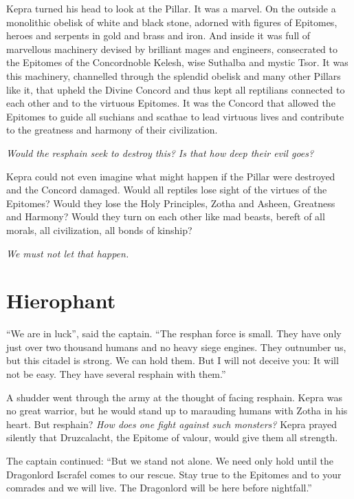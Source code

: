 \documentclass
  [a4paper,
   12pt,
   oneside
  ]%
  {article}
\begin{document}
Kepra turned his head to look at the Pillar. It was a marvel. On the outside a monolithic obelisk of white and black stone, adorned with figures of Epitomes, heroes and serpents in gold and brass and iron. And inside it was full of marvellous machinery devised by brilliant mages and engineers, consecrated to the Epitomes of the Concord\dash{}noble Kelesh, wise Suthalba and mystic Tsor. It was this machinery, channelled through the splendid obelisk and many other Pillars like it, that upheld the Divine Concord and thus kept all reptilians connected to each other and to the virtuous Epitomes. It was the Concord that allowed the Epitomes to guide all suchians and scathae to lead virtuous lives and contribute to the greatness and harmony of their civilization.

\emph{Would the resphain seek to destroy this? Is that how deep their evil goes?}

Kepra could not even imagine what might happen if the Pillar were destroyed and the Concord damaged. Would all reptiles lose sight of the virtues of the Epitomes? Would they lose the Holy Principles, Zotha and Asheen, Greatness and Harmony? Would they turn on each other like mad beasts, bereft of all morals, all civilization, all bonds of kinship?

\emph{
    We must not let that happen.%
     }



\section{Hierophant}
``We are in luck'', said the captain. ``The resphan force is small. They have only just over two thousand humans and no heavy siege engines. They outnumber us, but this citadel is strong. We can hold them. But I will not deceive you: It will not be easy. They have several resphain with them.'' 

A shudder went through the army at the thought of facing resphain. Kepra was no great warrior, but he would stand up to marauding humans with Zotha in his heart. 
But resphain? 
\emph{How does one fight against such monsters?}
Kepra prayed silently that Druzcalacht, the Epitome of valour, would give them all strength.

The captain continued: ``But we stand not alone. We need only hold until the Dragonlord Iscrafel comes to our rescue. Stay true to the Epitomes and to your comrades and we will live. The Dragonlord will be here before nightfall.''
\end{document}
